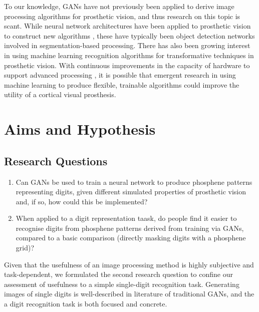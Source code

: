 \documentclass[a4paper,11pt,openany]{book}
\begin{document}
To our knowledge, GANs have not previously been applied to derive image processing algorithms for prosthetic vision, and thus research on this topic is scant.
While neural network architectures have been applied to prosthetic vision to construct new algorithms \cite{mace_simulated_2015,ge_spiking_2017,sanchez-garcia_structural_2018}, these have typically been object detection networks involved in segmentation-based processing.
There has also been growing interest in using machine learning recognition algorithms for transformative techniques in prosthetic vision. \cite{chichilnisky_eduardo-jose_smart_2018}
With continuous improvements in the capacity of hardware to support advanced processing \cite{moore_cramming_1998}, it is possible that emergent research in using machine learning to produce flexible, trainable algorithms could improve the utility of a cortical visual prosthesis.



\clearpage

\chapter{Aims and Hypothesis}
\label{sec:orgcb12cee}

\section*{Research Questions}
\label{sec:orge608a3e}

\begin{enumerate}
\item Can GANs be used to train a neural network to produce phosphene patterns representing digits, given different simulated properties of prosthetic vision and, if so, how could this be implemented?
\item When applied to a digit representation taask, do people find it easier to recognise digits from phosphene patterns derived from training via GANs, compared to a basic comparison (directly masking digits with a phosphene grid)?
\end{enumerate}

Given that the usefulness of an image processing method is highly subjective and task-dependent, we formulated the second research question to confine our assessment of usefulness to a simple single-digit recognition task.
Generating images of single digits is well-described in literature of traditional GANs, and the a digit recognition task is both focused and concrete.
\end{document}
